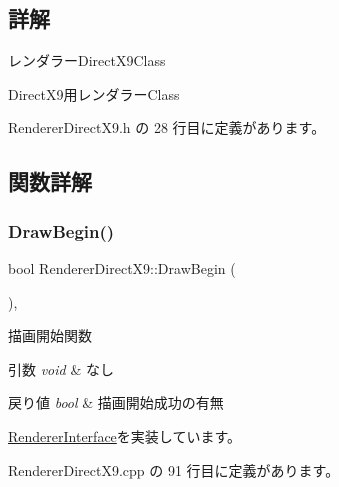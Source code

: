 \subsection{詳解}
レンダラー\+Direct\+X9\+Class 

Direct\+X9用レンダラー\+Class 

 Renderer\+Direct\+X9.\+h の 28 行目に定義があります。



\subsection{関数詳解}
\mbox{\label{class_renderer_direct_x9_a5113bf4e6aefdb7bcab2016fbbee0174}} 
\subsubsection{\texorpdfstring{Draw\+Begin()}{DrawBegin()}}
{\footnotesize\ttfamily bool Renderer\+Direct\+X9\+::\+Draw\+Begin (\begin{DoxyParamCaption}{ }\end{DoxyParamCaption})\hspace{0.3cm}{\ttfamily [override]}, {\ttfamily [virtual]}}



描画開始関数 


\begin{DoxyParams}{引数}
{\em void} & なし \\
\hline
\end{DoxyParams}

\begin{DoxyRetVals}{戻り値}
{\em bool} & 描画開始成功の有無 \\
\hline
\end{DoxyRetVals}


\mbox{\hyperlink{class_renderer_interface_a86a487deb4e4207a67410d00ec670fd7}{Renderer\+Interface}}を実装しています。



 Renderer\+Direct\+X9.\+cpp の 91 行目に定義があります。

\mbox{\label{class_renderer_direct_x9_a5f934597020f77dc9cf729acfb13a830}} 
